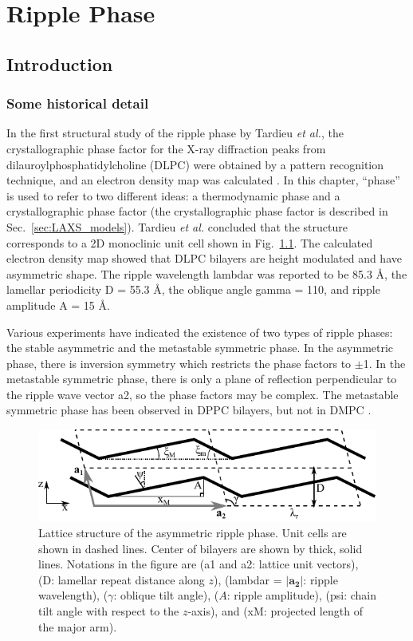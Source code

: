\chapter{Ripple Phase}\label{chap:ripple}
\section{Introduction}\label{sec:ripple_introduction}
\subsection{Some historical detail}
In the first structural study of the ripple phase by Tardieu \textit{et al.},
the crystallographic phase factor for the X-ray diffraction peaks from 
dilauroylphosphatidylcholine (\gls{DLPC}) were obtained
by a pattern recognition technique, and an electron density map was calculated
\cite{ref:Tardieu73}. 
In this chapter, ``phase'' is used to refer to two different ideas: a thermodynamic phase
and a crystallographic phase factor (the crystallographic phase factor is described in
Sec.~\ref{sec:LAXS_models}).
Tardieu \textit{et al.} concluded that the structure
corresponds to a 2D monoclinic unit cell shown in Fig.~\ref{fig:unit_cell}.
The calculated 
electron density map showed that DLPC bilayers are height modulated
and have asymmetric shape. 
The ripple wavelength \gls{lambdar} was reported to be 85.3 \AA, 
the lamellar periodicity \gls{D} = 55.3 \AA, the oblique angle
\gls{gamma} = 110\textdegree, and ripple amplitude \gls{A} = 15 \AA.

Various experiments have indicated the existence of two types of ripple phases:
the stable asymmetric and the metastable symmetric phase. In the asymmetric
phase, there is inversion symmetry which restricts the phase factors to $\pm$1.
In the metastable symmetric phase, there is only 
a plane of reflection perpendicular to the ripple wave vector \gls{a2},
so the phase factors may be complex. 
The metastable symmetric phase has been observed in DPPC bilayers, but not
in DMPC \cite{ref:Koynova96,ref:Katsaras00}.

\begin{figure}[htbp]
  \centering
  \includegraphics[width=\textwidth]{figures/ripple/unit_cell}
  \caption[Lattice structure of the asymmetric ripple phase]
  {Lattice structure of the asymmetric ripple phase. Unit cells are shown in
  dashed lines. Center of bilayers are shown by thick, solid lines. Notations 
  in the figure are (\gls{a1} and \gls{a2}: lattice unit vectors),
  (\gls{D}: lamellar repeat distance along $z$), 
  (\gls{lambdar} = $|\mathbf{a_2}|$: ripple wavelength), 
  ($\gamma$: oblique tilt angle), ($A$: ripple amplitude),
  (\gls{psi}: chain tilt angle with respect to the $z$-axis),
  and (\gls{xM}: projected length of the major arm).}
  \label{fig:unit_cell}
\end{figure}

